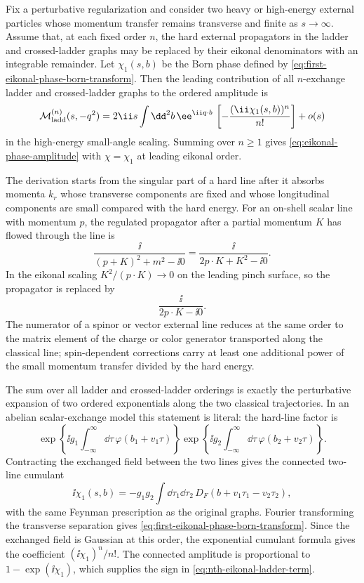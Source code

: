\begin{controlledapproximation}
\label{ca:eikonal-exponentiation-repeated-exchange}
Fix a perturbative regularization and consider two heavy or high-energy
external particles whose momentum transfer remains transverse and finite as
\(s\to\infty\).  Assume that, at each fixed order \(n\), the hard external
propagators in the ladder and crossed-ladder graphs may be replaced by their
eikonal denominators with an integrable remainder.  Let
\(\chi_1(s,b)\) be the Born phase defined by
\eqref{eq:first-eikonal-phase-born-transform}.  Then the leading contribution
of all \(n\)-exchange ladder and crossed-ladder graphs to the ordered
amplitude is
\begin{equation}
  \mathcal M_{\rm ladd}^{(n)}(s,-q^2)
  =
  2\ii s\int\dd^2b\,\ee^{\ii q\cdot b}\,
  \left[-\frac{(\ii\chi_1(s,b))^n}{n!}\right]
  +o(s)
  \label{eq:nth-eikonal-ladder-term}
\end{equation}
in the high-energy small-angle scaling.  Summing over \(n\ge1\) gives
\eqref{eq:eikonal-phase-amplitude} with \(\chi=\chi_1\) at leading eikonal
order.
\end{controlledapproximation}

The derivation starts from the singular part of a hard
line after it absorbs momenta \(k_r\) whose transverse components are fixed
and whose longitudinal components are small compared with the hard energy.
For an on-shell scalar line with momentum \(p\), the regulated propagator
after a partial momentum \(K\) has flowed through the line is
\[
  \frac{\ii}{(p+K)^2+m^2-\ii0}
  =
  \frac{\ii}{2p\cdot K+K^2-\ii0}.
\]
In the eikonal scaling \(K^2/(p\cdot K)\to0\) on the leading pinch surface, so
the propagator is replaced by
\[
  \frac{\ii}{2p\cdot K-\ii0}.
\]
The numerator of a spinor or vector external line reduces at the same order to
the matrix element of the charge or color generator transported along the
classical line; spin-dependent corrections carry at least one additional
power of the small momentum transfer divided by the hard energy.

The sum over all ladder and crossed-ladder orderings is exactly the
perturbative expansion of two ordered exponentials along the two classical
trajectories.  In an abelian scalar-exchange model this statement is literal:
the hard-line factor is
\[
  \exp\!\left\{\ii g_1\int_{-\infty}^{\infty}\dd\tau\,
  \varphi(b_1+v_1\tau)\right\}
  \exp\!\left\{\ii g_2\int_{-\infty}^{\infty}\dd\tau\,
  \varphi(b_2+v_2\tau)\right\}.
\]
Contracting the exchanged field between the two lines gives the connected
two-line cumulant
\[
  \ii\chi_1(s,b)
  =
  -g_1g_2
  \int\dd\tau_1\dd\tau_2\,
  D_F(b+v_1\tau_1-v_2\tau_2),
\]
with the same Feynman prescription as the original graphs.  Fourier
transforming the transverse separation gives
\eqref{eq:first-eikonal-phase-born-transform}.  Since the exchanged field is
Gaussian at this order, the exponential cumulant formula gives the coefficient
\((\ii\chi_1)^n/n!\).  The connected amplitude is proportional to
\(1-\exp(\ii\chi_1)\), which supplies the sign in
\eqref{eq:nth-eikonal-ladder-term}.

